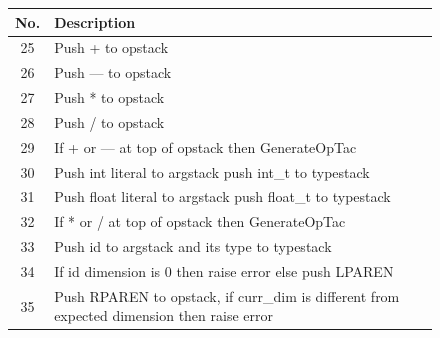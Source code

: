 \begin{figure}[H]
    \centering
    \begin{tabular}{cp{3in}}
        \toprule
        \textbf{No.} & \textbf{Description}\\
        \midrule 25 & Push + to opstack\\
        \midrule 26 & Push --- to opstack\\
        \midrule 27 & Push * to opstack\\
        \midrule 28 & Push / to opstack\\
        \midrule 29 & If + or --- at top of opstack then GenerateOpTac\\
        \midrule 30 & Push int literal to argstack push int\_t to typestack\\
        \midrule 31 & Push float literal to argstack push float\_t to typestack\\
        \midrule 32 & If * or / at top of opstack then GenerateOpTac\\
        \midrule 33 & Push id to argstack and its type to typestack\\
        \midrule 34 & If id dimension is 0 then raise error else push LPAREN\\
        \midrule 35 & Push RPAREN to opstack, if curr\_dim is different from
        expected dimension then raise error\\
        \bottomrule
    \end{tabular}
\end{figure}

\newpage

